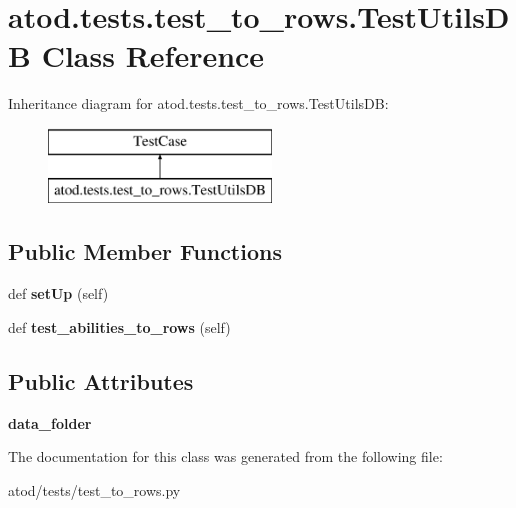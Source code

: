 \hypertarget{classatod_1_1tests_1_1test__to__rows_1_1_test_utils_d_b}{}\section{atod.\+tests.\+test\+\_\+to\+\_\+rows.\+Test\+Utils\+DB Class Reference}
\label{classatod_1_1tests_1_1test__to__rows_1_1_test_utils_d_b}
Inheritance diagram for atod.\+tests.\+test\+\_\+to\+\_\+rows.\+Test\+Utils\+DB\+:\begin{figure}[H]
\begin{center}
\leavevmode
\includegraphics[height=2.000000cm]{classatod_1_1tests_1_1test__to__rows_1_1_test_utils_d_b}
\end{center}
\end{figure}
\subsection*{Public Member Functions}
\begin{DoxyCompactItemize}
\item 
def {\bfseries set\+Up} (self)\hypertarget{classatod_1_1tests_1_1test__to__rows_1_1_test_utils_d_b_afb201e7c93ce0e6f583950fc035d9df9}{}\label{classatod_1_1tests_1_1test__to__rows_1_1_test_utils_d_b_afb201e7c93ce0e6f583950fc035d9df9}

\item 
def {\bfseries test\+\_\+abilities\+\_\+to\+\_\+rows} (self)\hypertarget{classatod_1_1tests_1_1test__to__rows_1_1_test_utils_d_b_a7c8aa3dc51d185b1d9ecb064d8678aae}{}\label{classatod_1_1tests_1_1test__to__rows_1_1_test_utils_d_b_a7c8aa3dc51d185b1d9ecb064d8678aae}

\end{DoxyCompactItemize}
\subsection*{Public Attributes}
\begin{DoxyCompactItemize}
\item 
{\bfseries data\+\_\+folder}\hypertarget{classatod_1_1tests_1_1test__to__rows_1_1_test_utils_d_b_ae0cf5fd9b810c6072070db59f24b3aac}{}\label{classatod_1_1tests_1_1test__to__rows_1_1_test_utils_d_b_ae0cf5fd9b810c6072070db59f24b3aac}

\end{DoxyCompactItemize}


The documentation for this class was generated from the following file\+:\begin{DoxyCompactItemize}
\item 
atod/tests/test\+\_\+to\+\_\+rows.\+py\end{DoxyCompactItemize}
